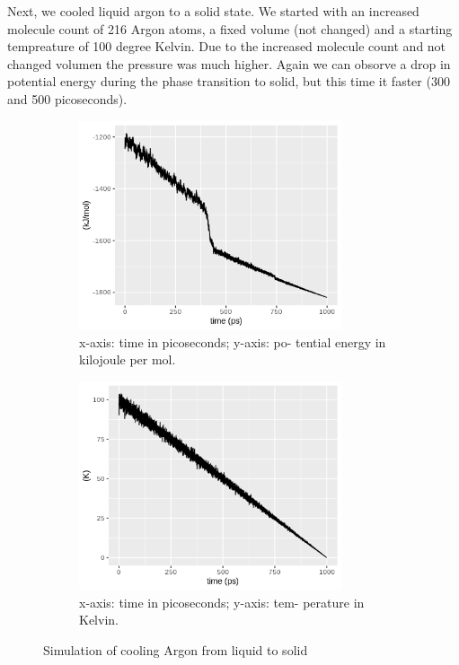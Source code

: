 \documentclass[10pt, a4paper, oneside, twocolumn]{report}
\begin{document}
Next, we cooled liquid argon to a solid state. We started with an increased molecule count of 216 Argon atoms, a fixed volume (not changed) and a starting tempreature of 100 degree Kelvin. Due to the increased molecule count and not changed volumen the pressure was much higher. Again we can obsorve a drop in potential energy during the phase transition to solid, but this time it faster (300 and 500 picoseconds).

\begin{figure}
	\begin{subfigure}[HB!]{0.5\textwidth}
	\includegraphics[width=0.85\textwidth]{plots//freezing/freezing_pot_en.png}
    \caption{x-axis: time in picoseconds; y-axis: po-
    	tential energy in kilojoule per mol.}
\end{subfigure}
	\begin{subfigure}[HB!]{0.5\textwidth}
	\includegraphics[width=0.85\textwidth]{plots//freezing/freezing_temp.png}
    \caption{x-axis: time in picoseconds; y-axis: tem-
    	perature in Kelvin.}
\end{subfigure}
\caption{Simulation of cooling Argon from liquid to solid}
\end{figure}
\end{document}
